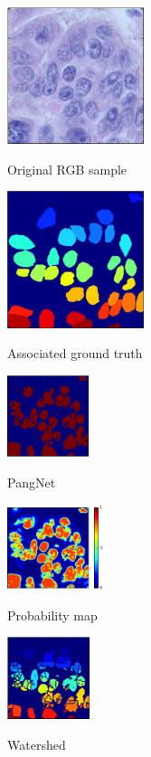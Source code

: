 \documentclass{article}
\begin{document}
\begin{figure}[htb]
\begin{minipage}[b]{.48\linewidth}
  \centering
  \centerline{\includegraphics[height=4.0cm]{RGB_pred}}
  \centerline{Original RGB sample}\medskip
\end{minipage}
\hfill
\begin{minipage}[b]{0.48\linewidth}
  \centering
  \centerline{\includegraphics[width=4.0cm]{GT_pred}}
  \centerline{Associated ground truth}\medskip
\end{minipage}


\begin{minipage}[b]{0.32\linewidth}
  \centering
  \centerline{\includegraphics[height=2.4cm]{BaochuanB}}
  \centerline{PangNet}\medskip
\end{minipage}
\hfill
\begin{minipage}[b]{.32\linewidth}
  \centering
  \centerline{\includegraphics[height=2.5cm]{BaochuanP}}
  \centerline{Probability map}\medskip
\end{minipage}
\hfill
\begin{minipage}[b]{.32\linewidth}
  \centering
  \centerline{\includegraphics[height=2.4cm]{Baochuan_WS}}
  \centerline{Watershed}\medskip
\end{minipage}


\end{figure}
\end{document}
